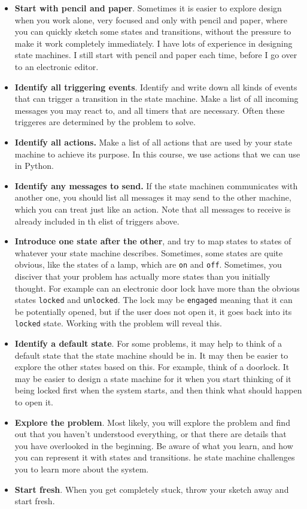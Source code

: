 \documentclass[10pt, twoside, twocolumn]{book}
\providecommand{\tightlist}{%
  \setlength{\itemsep}{0pt}\setlength{\parskip}{0pt}}
\begin{document}
\begin{itemize}
\tightlist
\item
  \textbf{Start with pencil and paper}. Sometimes it is easier to
  explore design when you work alone, very focused and only with pencil
  and paper, where you can quickly sketch some states and transitions,
  without the pressure to make it work completely immediately. I have
  lots of experience in designing state machines. I still start with
  pencil and paper each time, before I go over to an electronic editor.
\item
  \textbf{Identify all triggering events}. Identify and write down all
  kinds of events that can trigger a transition in the state machine.
  Make a list of all incoming messages you may react to, and all timers
  that are necessary. Often these triggeres are determined by the
  problem to solve.
\item
  \textbf{Identify all actions.} Make a list of all actions that are
  used by your state machine to achieve its purpose. In this course, we
  use actions that we can use in Python.
\item
  \textbf{Identify any messages to send.} If the state machinen
  communicates with another one, you should list all messages it may
  send to the other machine, which you can treat just like an action.
  Note that all messages to receive is already included in th elist of
  triggers above.
\item
  \textbf{Introduce one state after the other}, and try to map states to
  states of whatever your state machine describes. Sometimes, some
  states are quite obvious, like the states of a lamp, which are
  \texttt{on} and \texttt{off}. Sometimes, you disciver that your
  problem has actually more states than you initially thought. For
  example can an electronic door lock have more than the obvious states
  \texttt{locked} and \texttt{unlocked}. The lock may be
  \texttt{engaged} meaning that it can be potentially opened, but if the
  user does not open it, it goes back into its \texttt{locked} state.
  Working with the problem will reveal this.
\item
  \textbf{Identify a default state}. For some problems, it may help to
  think of a default state that the state machine should be in. It may
  then be easier to explore the other states based on this. For example,
  think of a doorlock. It may be easier to design a state machine for it
  when you start thinking of it being locked first when the system
  starts, and then think what should happen to open it.\\
\item
  \textbf{Explore the problem}. Most likely, you will explore the
  problem and find out that you haven't understood everything, or that
  there are details that you have overlooked in the beginning. Be aware
  of what you learn, and how you can represent it with states and
  transitions. he state machine challenges you to learn more about the
  system.
\item
  \textbf{Start fresh}. When you get completely stuck, throw your sketch
  away and start fresh.
\end{itemize}
\end{document}
